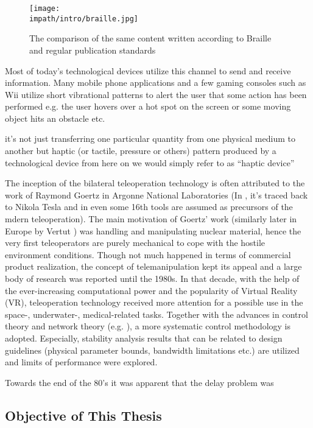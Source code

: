 \begin{figure}%
\centering
\texttt{[image: \\impath/intro/braille.jpg]}%
\caption{The comparison of the same content written according to Braille and regular publication standards}%
\label{fig:braille}%
\end{figure}

Most of today's technological devices utilize this channel to send and receive information. Many mobile phone applications and a few gaming consoles such as Wii\raisebox{0.5ex}{\scriptsize\texttrademark} utilize short vibrational patterns to alert the user that some action has been performed e.g. the user hovers over a hot spot on the screen or some moving object hits an obstacle etc. 







it's not just transferring one particular quantity from one physical medium to another but  haptic (or tactile, pressure or others) pattern produced by a technological device from here on we would simply refer to as ``haptic device''






The inception of the bilateral teleoperation technology is often attributed to the work 
of Raymond Goertz in Argonne National Laboratories \cite{goertz} (In \cite{basanezsuarez}, 
it's traced back to Nikola Tesla and in \cite{sheridan89} even some 16th tools are assumed as precursors 
of the mdern teleoperation). The main motivation of Goertz' work (similarly later in Europe 
by Vertut \cite{vertutcoiffet}) was handling and manipulating nuclear material, hence the very 
first teleoperators are purely mechanical to cope with the hostile environment conditions. Though not much 
happened in terms of commercial product realization, the concept of telemanipulation kept its appeal 
and a large body of research was reported until the 1980s. In that decade, with the help of the 
ever-increasing computational power and the popularity of Virtual Reality (VR), teleoperation 
technology received more attention for a possible use in the space-, underwater-, medical-related 
tasks. Together with the advances in control theory and network theory (e.g. \cite{miyazaki,furuta}), 
a more systematic control methodology is adopted. Especially, stability analysis results that can be 
related to design guidelines (physical parameter bounds, bandwidth limitations etc.) are utilized
and limits of performance were explored. 

Towards the end of the 80's it was apparent that the delay problem was 



\subsection{Objective of This Thesis}





%
%
%
